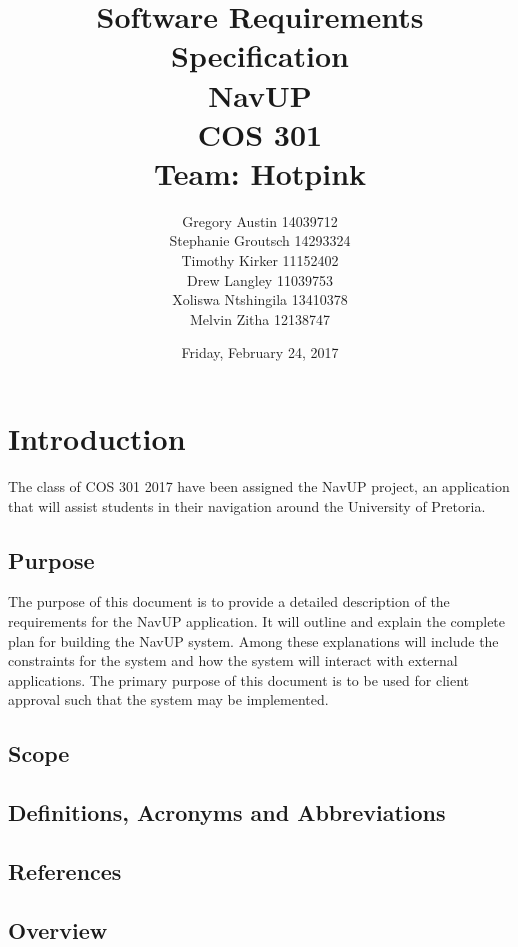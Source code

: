 \documentclass[12pt,a4paper]{report}
\title{Software Requirements Specification \\ NavUP \\ COS 301 \\ Team: Hotpink}
\date{Friday, February 24, 2017}
\author{Gregory Austin 14039712 \\ Stephanie Groutsch 14293324 \\ Timothy Kirker 11152402 \\ Drew Langley 11039753 \\ Xoliswa Ntshingila 13410378 \\ Melvin Zitha 12138747}
\begin{document}
\maketitle



\newpage
 \section*{Introduction}
The class of COS 301 2017 have been assigned the NavUP project, an application that will assist students in their navigation around the University of Pretoria.

	\subsection*{Purpose}
	The purpose of this document is to provide a detailed description of the requirements for the NavUP application. It will outline and explain the complete plan for building the NavUP system. 
	Among these explanations will include the constraints for the system and how the system will interact with external applications. The primary purpose of this document is to be used for client approval such that the system may be implemented.

		
	\subsection*{Scope}
		
		
	\subsection*{Definitions, Acronyms and Abbreviations}
	
	\subsection*{References}
	
	
	\subsection*{Overview}
		

\newpage
\end{document}
